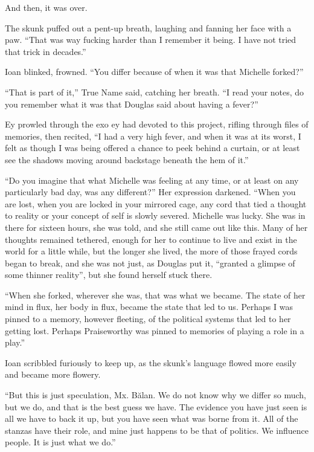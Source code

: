 And then, it was over.

The skunk puffed out a pent-up breath, laughing and fanning her face with a paw. ``That was way fucking harder than I remember it being. I have not tried that trick in decades.''

Ioan blinked, frowned. ``You differ because of when it was that Michelle forked?''

``That is part of it,'' True Name said, catching her breath. ``I read your notes, do you remember what it was that Douglas said about having a fever?''

Ey prowled through the exo ey had devoted to this project, rifling through files of memories, then recited, ``I had a very high fever, and when it was at its worst, I felt as though I was being offered a chance to peek behind a curtain, or at least see the shadows moving around backstage beneath the hem of it.''

``Do you imagine that what Michelle was feeling at any time, or at least on any particularly bad day, was any different?'' Her expression darkened. ``When you are lost, when you are locked in your mirrored cage, any cord that tied a thought to reality or your concept of self is slowly severed. Michelle was lucky. She was in there for sixteen hours, she was told, and she still came out like this. Many of her thoughts remained tethered, enough for her to continue to live and exist in the world for a little while, but the longer she lived, the more of those frayed cords began to break, and she was not just, as Douglas put it, ``granted a glimpse of some thinner reality'', but she found herself stuck there.

``When she forked, wherever she was, that was what we became. The state of her mind in flux, her body in flux, became the state that led to us. Perhaps I was pinned to a memory, however fleeting, of the political systems that led to her getting lost. Perhaps Praiseworthy was pinned to memories of playing a role in a play.''

Ioan scribbled furiously to keep up, as the skunk's language flowed more easily and became more flowery.

``But this is just speculation, Mx. Bălan. We do not know why we differ so much, but we do, and that is the best guess we have. The evidence you have just seen is all we have to back it up, but you have seen what was borne from it. All of the stanzas have their role, and mine just happens to be that of politics. We influence people. It is just what we do.''

